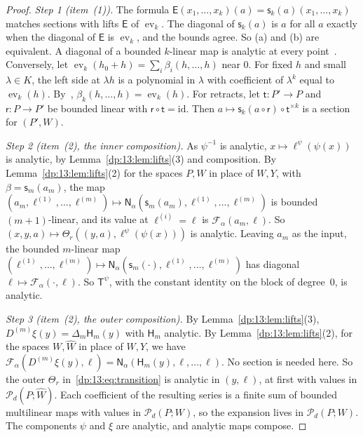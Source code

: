 \documentclass[11pt]{amsart}
\theoremstyle{definition}
\theoremstyle{remark}
\numberwithin{equation}{section}
\newcommand{\id}{\mathrm{id}}
\theoremstyle{plain}
\theoremstyle{definition}
\theoremstyle{plain}
\newcommand{\ev}{\operatorname{ev}}
\newcommand{\cP}{\mathcal P}
\begin{document}
\begin{proof}
\emph{Step 1 (item~(1)).} The formula $\mathsf E(x_1,\dots,x_k)(a)=\mathsf s_k(a)(x_1,\dots,x_k)$ matches sections with lifts $\mathsf E$ of $\ev_k$. The diagonal of $\mathsf s_k(a)$ is $a$ for all $a$ exactly when the diagonal of $\mathsf E$ is $\ev_k$, and the bounds agree. So (a) and (b) are equivalent. A diagonal of a bounded $k$-linear map is analytic at every point~\cite[Proposition~2.5]{I}. Conversely, let $\ev_k(h_0+h)=\sum_i\beta_i(h,\dots,h)$ near $0$. For fixed $h$ and small $\lambda\in K$, the left side at $\lambda h$ is a polynomial in $\lambda$ with coefficient of $\lambda^k$ equal to $\ev_k(h)$. By~\cite[Lemma~A.1]{I}, $\beta_k(h,\dots,h)=\ev_k(h)$. For retracts, let $\mathsf t\colon P'\to P$ and $\mathsf r\colon P\to P'$ be bounded linear with $\mathsf r\circ\mathsf t=\id$. Then $a\mapsto\mathsf s_k(a\circ\mathsf r)\circ\mathsf t^{\times k}$ is a section for $(P',W)$.

\emph{Step 2 (item~(2), the inner composition).} As $\psi^{-1}$ is analytic, $x\mapsto\ell^\psi(\psi(x))$ is analytic, by Lemma~\ref{dp:13:lem:lifts}(3) and composition. By Lemma~\ref{dp:13:lem:lifts}(2) for the spaces $P,W$ in place of $W,Y$, with $\beta=\mathsf s_m(a_m)$, the map $(a_m,\ell^{(1)},\dots,\ell^{(m)})\mapsto\mathsf N_\alpha(\mathsf s_m(a_m),\ell^{(1)},\dots,\ell^{(m)})$ is bounded $(m+1)$-linear, and its value at $\ell^{(i)}=\ell$ is $\mathcal F_\alpha(a_m,\ell)$. So $(x,y,a)\mapsto\Theta_r((y,a),\ell^\psi(\psi(x)))$ is analytic. Leaving $a_m$ as the input, the bounded $m$-linear map $(\ell^{(1)},\dots,\ell^{(m)})\mapsto\mathsf N_\alpha(\mathsf s_m({\cdot}),\ell^{(1)},\dots,\ell^{(m)})$ has diagonal $\ell\mapsto\mathcal F_\alpha({\cdot},\ell)$. So $\mathsf T^\psi$, with the constant identity on the block of degree~$0$, is analytic.

\emph{Step 3 (item~(2), the outer composition).} By Lemma~\ref{dp:13:lem:lifts}(3), $D^{(m)}\xi(y)=\Delta_m\mathsf H_m(y)$ with $\mathsf H_m$ analytic. By Lemma~\ref{dp:13:lem:lifts}(2), for the spaces $W,\widehat W$ in place of $W,Y$, we have $\mathcal F_\alpha(D^{(m)}\xi(y),\ell)=\mathsf N_\alpha(\mathsf H_m(y),\ell,\dots,\ell)$. No section is needed here. So the outer $\Theta_r$ in~\eqref{dp:13:eq:transition} is analytic in $(y,\ell)$, at first with values in $\cP_d(P;\widehat W)$. Each coefficient of the resulting series is a finite sum of bounded multilinear maps with values in $\cP_d(P;W)$, so the expansion lives in $\cP_d(P;W)$. The components $\psi$ and $\xi$ are analytic, and analytic maps compose.


\end{proof}
\end{document}
